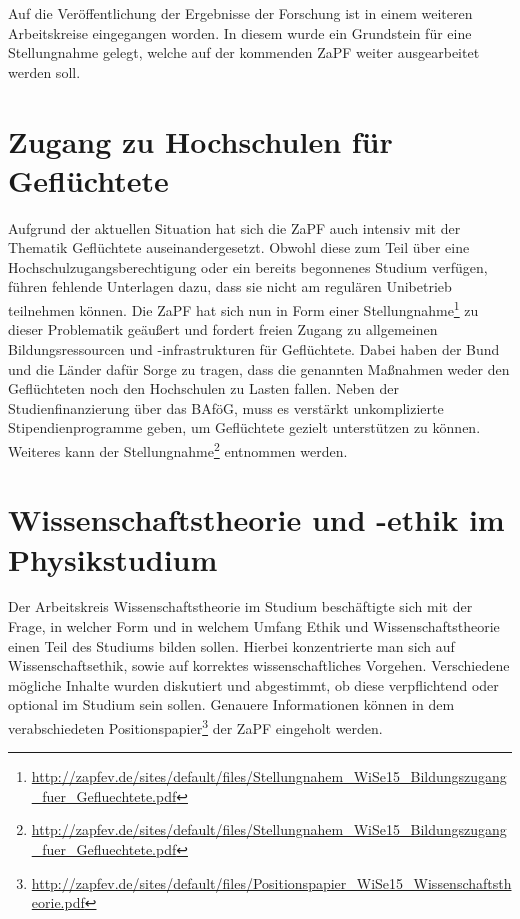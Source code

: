 Auf die Veröffentlichung der Ergebnisse der Forschung ist in einem weiteren Arbeitskreise
eingegangen worden. In diesem wurde ein Grundstein für eine Stellungnahme
gelegt, welche auf der kommenden ZaPF weiter ausgearbeitet werden soll.

\section*{Zugang zu Hochschulen für Geflüchtete}
Aufgrund der aktuellen Situation hat sich die ZaPF auch intensiv mit der
Thematik \glqq{}Geflüchtete\grqq{} auseinandergesetzt. Obwohl diese zum Teil
über eine Hochschulzugangsberechtigung oder ein bereits begonnenes Studium
verfügen, führen fehlende Unterlagen dazu, dass sie nicht am regulären
Unibetrieb teilnehmen können. Die ZaPF hat sich nun in Form einer
Stellungnahme\footnote{\href{http://zapfev.de/sites/default/files/Stellungnahem\_WiSe15\_Bildungszugang\_fuer\_Gefluechtete.pdf}{\url{http://zapfev.de/sites/default/files/Stellungnahem\_WiSe15\_Bildungszugang\_fuer\_Gefluechtete.pdf}}}
zu dieser Problematik geäußert und fordert freien Zugang zu allgemeinen
Bildungsressourcen und -infrastrukturen für Geflüchtete. Dabei haben der Bund
und die Länder dafür Sorge zu tragen, dass die genannten Maßnahmen weder den
Geflüchteten noch den Hochschulen zu Lasten fallen. Neben der
Studienfinanzierung über das BAföG, muss es verstärkt unkomplizierte
Stipendienprogramme geben, um Geflüchtete gezielt unterstützen zu können. Weiteres kann
der Stellungnahme\footnote{\href{http://zapfev.de/sites/default/files/Stellungnahem\_WiSe15\_Bildungszugang\_fuer\_Gefluechtete.pdf}{\url{http://zapfev.de/sites/default/files/Stellungnahem\_WiSe15\_Bildungszugang\_fuer\_Gefluechtete.pdf}}} entnommen werden.

\section*{Wissenschaftstheorie und -ethik im Physikstudium}
Der  Arbeitskreis \glqq{}Wissenschaftstheorie im Studium\grqq{} beschäftigte
sich mit der Frage, in welcher Form und in welchem Umfang Ethik und
Wissenschaftstheorie einen Teil des Studiums bilden sollen. Hierbei konzentrierte man
sich auf Wissenschaftsethik, sowie auf korrektes wissenschaftliches Vorgehen.
Verschiedene mögliche Inhalte wurden diskutiert und abgestimmt, ob diese
verpflichtend oder optional im Studium sein sollen. Genauere Informationen
können in dem verabschiedeten
Positionspapier\footnote{\href{http://zapfev.de/sites/default/files/Positionspapier\_WiSe15\_Wissenschaftstheorie.pdf}{\url{http://zapfev.de/sites/default/files/Positionspapier\_WiSe15\_Wissenschaftstheorie.pdf}}}
der ZaPF eingeholt werden.

